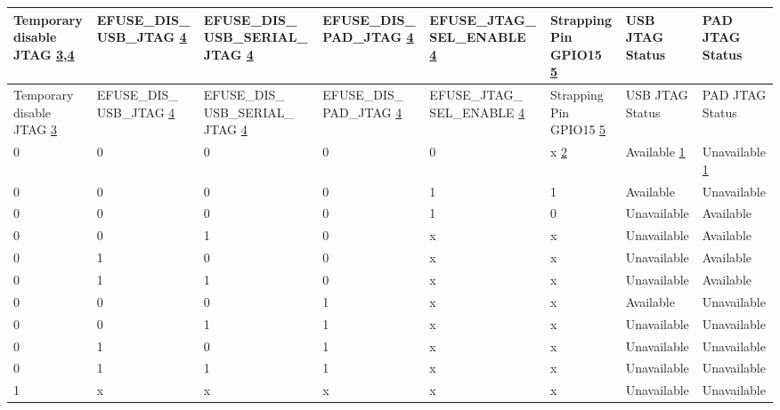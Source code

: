 
\begin{longtable}{ | p{1.4cm} | p{1.9cm} | p{2.1cm} | p{1.9cm} | p{2.1cm} | p{1.4cm} | p{1.7cm} | p{2.0cm} | }
\hline\rowcolor{lightgray}
Temporary disable JTAG \hyperref[JTAG footnote: 3]{3},\hyperref[JTAG footnote: 4]{4} & EFUSE\_DIS\_ USB\_JTAG \hyperref[JTAG footnote: 4]{4} & EFUSE\_DIS\_ USB\_SERIAL\_ JTAG \hyperref[JTAG footnote: 4]{4} & EFUSE\_DIS\_ PAD\_JTAG \hyperref[JTAG footnote: 4]{4} & EFUSE\_JTAG\_ SEL\_ENABLE \hyperref[JTAG footnote: 4]{4} & Strapping Pin GPIO15 \hyperref[JTAG footnote: 5]{5} & USB JTAG Status & PAD JTAG Status \\ \hline
\endfirsthead
\hline
\rowcolor{lightgray}
Temporary disable JTAG \hyperref[JTAG footnote: 3]{3} & EFUSE\_DIS\_ USB\_JTAG \hyperref[JTAG footnote: 4]{4} & EFUSE\_DIS\_ USB\_SERIAL\_ JTAG \hyperref[JTAG footnote: 4]{4} & EFUSE\_DIS\_ PAD\_JTAG \hyperref[JTAG footnote: 4]{4} & EFUSE\_JTAG\_ SEL\_ENABLE \hyperref[JTAG footnote: 4]{4} & Strapping Pin GPIO15  \hyperref[JTAG footnote: 5]{5} & USB JTAG Status & PAD JTAG Status \\ \hline
\hline
\endhead
\endfoot

0 & 0 & 0 & 0 & 0 & x \hyperref[JTAG footnote: 2]{2}	& Available	 \hyperref[JTAG footnote: 1]{1}  &     Unavailable  \hyperref[JTAG footnote: 1]{1}  \\\hline
0 & 0 & 0 & 0 & 1 & 1	& Available	  &     Unavailable   \\\hline
0 & 0 & 0 & 0 & 1 & 0	& Unavailable & 	Available \\\hline
0 & 0 & 1 & 0 & x & x	& Unavailable & 	Available \\\hline
0 & 1 & 0 & 0 & x & x	& Unavailable & 	Available \\\hline
0 & 1 & 1 & 0 & x & x	& Unavailable & 	Available \\\hline
0 & 0 & 0 & 1 & x & x	& Available	  &     Unavailable \\\hline
0 & 0 & 1 & 1 & x & x	& Unavailable & 	Unavailable \\\hline
0 & 1 & 0 & 1 & x & x	& Unavailable & 	Unavailable \\\hline
0 & 1 & 1 & 1 & x & x	& Unavailable & 	Unavailable \\\hline
1 & x & x & x & x & x	& Unavailable & 	Unavailable \\\hline

\end{longtable}


